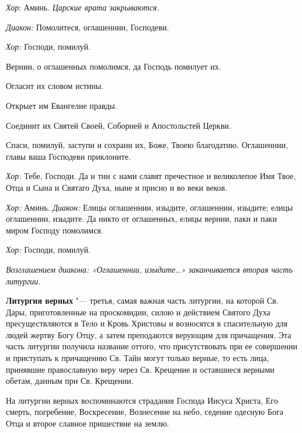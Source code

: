 \begin{mymulticols}
{\itshape Хор}: Аминь. {\itshape Царские врата закрываются.}


{\itshape Диакон:} Помолитеся, оглашеннии, Господеви.

{\itshape Хор:} Господи, помилуй.

Вернии, о оглашенных помолимся, да Господь помилует их.

Огласит их словом истины.

Открыет им Евангелие правды.

Соединит их Святей Своей, Соборней и Апостольстей Церкви.

Спаси, помилуй, заступи и сохрани их, Боже, Твоею благодатию. Оглашеннии, главы ваша Господеви приклоните.

{\itshape Хор:} Тебе, Господи. Да и тии с нами славят пречестное и великолепое Имя Твое, Отца и Сына и Святаго Духа, ныне и присно и во веки веков.

{\itshape Хор:} Аминь. {\itshape Диакон:} Елицы оглашеннии, изыдите, оглашеннии, изыдите; елицы оглашеннии, изыдите. Да никто от оглашенных, елицы вернии, паки и паки миром Господу помолимся.

{\itshape Хор:} Господи, помилуй.

{\itshape Возглашением диакона: «Оглашеннии, изыдите…» заканчивается вторая часть литургии.}

\end{mymulticols}

\mychapterending


{\bfseries Литургия верных} "--- третья, самая важная часть литургии, на которой Св. Дары, приготовленные на проскомидии, силою и действием Святого Духа пресуществляются в Тело и Кровь Христовы и возносятся в спасительную для людей жертву Богу Отцу, а затем преподаются верующим для причащения. Эта часть литургии получила название оттого, что присутствовать при ее совершении и приступать к причащению Св. Тайн могут только верные, то есть лица, принявшие православную веру через Св. Крещение и оставшиеся верными обетам, данным при Св. Крещении.

На литургии верных воспоминаются страдания Господа Иисуса Христа, Его смерть, погребение, Воскресение, Вознесение на небо, седение одесную Бога Отца и второе славное пришествие на землю.

